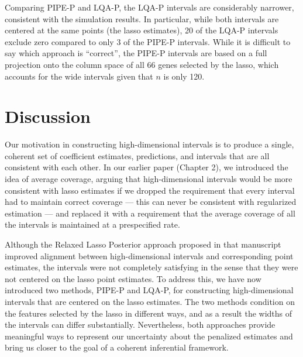 Comparing PIPE-P and LQA-P, the LQA-P intervals are considerably narrower, consistent with the simulation results. In particular, while both intervals are centered at the same points (the lasso estimates), 20 of the LQA-P intervals exclude zero compared to only 3 of the PIPE-P intervals. While it is difficult to say which approach is ``correct'', the PIPE-P intervals are based on a full projection onto the column space of all 66 genes selected by the lasso, which accounts for the wide intervals given that $n$ is only 120.

\section{Discussion}

Our motivation in constructing high-dimensional intervals is to produce a single, coherent set of coefficient estimates, predictions, and intervals that are all consistent with each other. In our earlier paper (Chapter 2), we introduced the idea of average coverage, arguing that high-dimensional intervals would be more consistent with lasso estimates if we dropped the requirement that every interval had to maintain correct coverage --- this can never be consistent with regularized estimation --- and replaced it with a requirement that the average coverage of all the intervals is maintained at a prespecified rate. 

Although the Relaxed Lasso Posterior approach proposed in that manuscript improved alignment between high-dimensional intervals and corresponding point estimates, the intervals were not completely satisfying in the sense that they were not centered on the lasso point estimates. To address this, we have now introduced two methods, PIPE-P and LQA-P, for constructing high-dimensional intervals that are centered on the lasso estimates. The two methods condition on the features selected by the lasso in different ways, and as a result the widths of the intervals can differ substantially. Nevertheless, both approaches provide meaningful ways to represent our uncertainty about the penalized estimates and bring us closer to the goal of a coherent inferential framework.

\newpage

